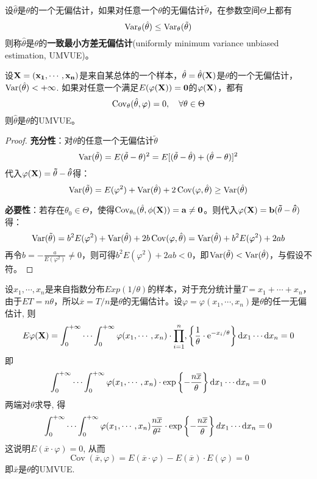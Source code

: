 \begin{definition}[一致最小方差无偏估计]\label{def:UMVUE}
    设$\hat\theta$是$\theta$的一个无偏估计，如果对任意一个$\theta$的无偏估计$\tilde\theta$，在参数空间$\Theta$上都有
    \[ \operatorname{Var}_\theta(\hat\theta) \le \operatorname{Var}_\theta(\tilde\theta) \]
    则称$\hat\theta$是$\theta$的\textbf{一致最小方差无偏估计}(uniformly minimum variance unbiased estimation, UMVUE)。
\end{definition}

\begin{theorem}[UMVUE的充要条件]
    设$\bf X=(x_1,\cdots,x_n)$是来自某总体的一个样本，$\hat\theta=\hat\theta(\bf X)$是$\theta$的一个无偏估计，$\operatorname{Var}(\hat\theta)<+\infty$. 如果对任意一个满足$E(\varphi(\bf X))=0$的$\varphi(\bf X)$，都有
    \[ \operatorname{Cov}_\theta(\hat\theta,\varphi) = 0,\quad \forall \theta \in\Theta \]
    则$\hat\theta$是$\theta$的UMVUE。
\end{theorem}
\begin{proof}
    \textbf{充分性}：对$\theta$的任意一个无偏估计$\tilde\theta$
    \[ \operatorname{Var}(\tilde \theta) = E(\tilde\theta - \theta)^2 = E [(\tilde\theta - \hat\theta) + (\hat\theta - \theta)]^2 \]
    代入$\varphi(\bf X)=\tilde\theta - \hat\theta$得：
    \[ \operatorname{Var}(\tilde \theta) = E(\varphi^2) + \operatorname{Var}(\hat\theta) + 2\operatorname{Cov}(\varphi,\hat\theta) \ge \operatorname{Var}(\hat\theta) \]

    \textbf{必要性}：若存在$\theta_0 \in \Theta$，使得$\operatorname{Cov}_{\theta_0}(\hat{\theta},\phi(\bf X))=a \neq 0$。则代入$\varphi(\bf X)=b(\tilde\theta - \hat\theta)$得：
    \[ \operatorname{Var}(\tilde \theta) = b^2E(\varphi^2) + \operatorname{Var}(\hat\theta) + 2b\operatorname{Cov}(\varphi,\hat\theta)=\operatorname{Var}(\hat\theta) + b^2E(\varphi^2) + 2ab \]
    再令$b=-\frac{a}{E(\varphi^2)}\neq 0$，则可得$b^2E(\varphi^2) + 2ab<0$，即$\operatorname{Var}(\tilde \theta)<\operatorname{Var}(\hat\theta)$，与假设不符。
\end{proof}

\begin{example}
    设$x_1, \cdots, x_n$是来自指数分布$Exp(1/\theta)$的样本，对于充分统计量$T=x_{1}+\cdots+x_{n}$，由于$ET=n\theta$，所以$\overline{x}=T / n$是$\theta$的无偏估计。设$\varphi=\varphi\left(x_{1}, \cdots, x_{n}\right)$是$\theta$的任一无偏估计, 则
    \[ E \varphi(\mathbf{X})=\int_0^{+\infty} \cdots \int_0^{+\infty} \varphi(x_1, \cdots, x_n) \cdot \prod_{i=1}^n,\left\{\frac1{\theta} \cdot \mathrm e^{-x_i / \theta}\right\} \mathrm{d} x_1 \cdots \mathrm{d} x_n=0 \]
    即
    \[ \int_0^{+\infty} \cdots \int_0^{+\infty} \varphi(x_1, \cdots, x_n) \cdot \exp\left\{-\frac{n \overline{x}}{\theta}\right\} \mathrm{d} x_1 \cdots \mathrm{d} x_n=0 \]
    两端对$\theta$求导, 得
    \[ \int_0^{+\infty} \cdots \int_0^{+\infty} \varphi(x_1, \cdots, x_n) \frac{n \overline{x}}{\theta^{2}}  \cdot \exp\left\{-\frac{n \overline{x}}{\theta}\right\} \\d x_1 \cdots \mathrm{d} x_n=0 \]
    这说明$E(\overline{x} \cdot \varphi)=0$, 从而
    \[ \operatorname{Cov}(\overline{x}, \varphi)=E(\overline{x} \cdot \varphi)-E(\overline{x}) \cdot E(\varphi)=0    \]
    即$\bar x$是$\theta$的UMVUE.
\end{example}

